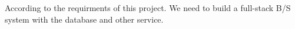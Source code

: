 According to the requirments of this project. We need to build a full-stack B/S system 
with the database and other service.